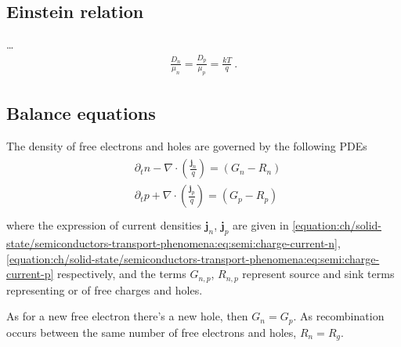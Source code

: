\documentclass[letterpaper,10pt,english]{jupyterBook}
\begin{document}
\subsection{Einstein relation}
\label{\detokenize{ch/solid-state/semiconductors-transport-phenomena:einstein-relation}}\label{\detokenize{ch/solid-state/semiconductors-transport-phenomena:semiconductors-transport-phenomena-einstein-relation}}
\sphinxAtStartPar
…
\begin{equation}\label{equation:ch/solid-state/semiconductors-transport-phenomena:eq:semi:einstein-relation}
\begin{split}\frac{D_n}{\mu_n} = \frac{D_p}{\mu_p} = \frac{k T}{q} \ .\end{split}
\end{equation}

\subsection{Balance equations}
\label{\detokenize{ch/solid-state/semiconductors-transport-phenomena:balance-equations}}\label{\detokenize{ch/solid-state/semiconductors-transport-phenomena:semiconductors-transport-phenomena-equations}}
\sphinxAtStartPar
The density of free electrons and holes are governed by the following PDEs
\begin{equation}\label{equation:ch/solid-state/semiconductors-transport-phenomena:eq:semi:num-balance}
\begin{split}\begin{aligned}
  & \partial_t n - \nabla \cdot \left( \frac{\mathbf{j}_n}{q} \right) = ( G_n - R_n ) \\
  & \partial_t p + \nabla \cdot \left( \frac{\mathbf{j}_p}{q} \right) = ( G_p - R_p ) \\
\end{aligned}\end{split}
\end{equation}
\sphinxAtStartPar
where the expression of current densities \(\mathbf{j}_n\), \(\mathbf{j}_p\) are given in \eqref{equation:ch/solid-state/semiconductors-transport-phenomena:eq:semi:charge-current-n}, \eqref{equation:ch/solid-state/semiconductors-transport-phenomena:eq:semi:charge-current-p} respectively, and the terms \(G_{n,p}\), \(R_{n,p}\) represent source and sink terms representing  or  of free charges and holes.

\sphinxAtStartPar
As for a new free electron there’s a new hole, then \(G_n = G_p\). As recombination occurs between the same number of free electrons and holes, \(R_n = R_g\).
\end{document}
